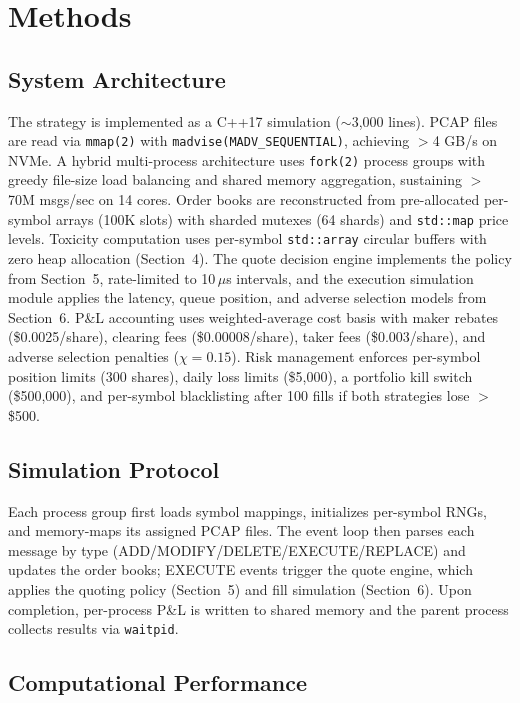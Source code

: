 \documentclass[11pt]{article}
\theoremstyle{definition}
\begin{document}
\section{Methods}

\subsection{System Architecture}
\label{sec:architecture}

The strategy is implemented as a C++17 simulation ($\sim$3,000 lines). PCAP files are read via \texttt{mmap(2)} with \texttt{madvise(MADV\_SEQUENTIAL)}, achieving $>$4 GB/s on NVMe. A hybrid multi-process architecture uses \texttt{fork(2)} process groups with greedy file-size load balancing and shared memory aggregation, sustaining $>$70M msgs/sec on 14 cores. Order books are reconstructed from pre-allocated per-symbol arrays (100K slots) with sharded mutexes (64 shards) and \texttt{std::map} price levels. Toxicity computation uses per-symbol \texttt{std::array} circular buffers with zero heap allocation (Section~4). The quote decision engine implements the policy from Section~5, rate-limited to 10\,$\mu$s intervals, and the execution simulation module applies the latency, queue position, and adverse selection models from Section~6. P\&L accounting uses weighted-average cost basis with maker rebates (\$0.0025/share), clearing fees (\$0.00008/share), taker fees (\$0.003/share), and adverse selection penalties ($\chi = 0.15$). Risk management enforces per-symbol position limits (300 shares), daily loss limits (\$5,000), a portfolio kill switch (\$500,000), and per-symbol blacklisting after 100 fills if both strategies lose $>$\$500.

\subsection{Simulation Protocol}

Each process group first loads symbol mappings, initializes per-symbol RNGs, and memory-maps its assigned PCAP files. The event loop then parses each message by type (ADD/MODIFY/DELETE/EXECUTE/REPLACE) and updates the order books; EXECUTE events trigger the quote engine, which applies the quoting policy (Section~5) and fill simulation (Section~6). Upon completion, per-process P\&L is written to shared memory and the parent process collects results via \texttt{waitpid}.

\subsection{Computational Performance}
\end{document}
